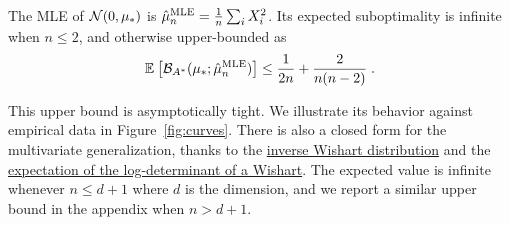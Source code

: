 \documentclass{article}
\newcommand*{\expect}[2][]{\ensuremath{\mathbb{E}_{#1} \left[ #2 \right] }} %
\newcommand{\logpart}{A}
\newcommand{\bregmanconj}{\cB_{\logpart^*}}
\begin{document}
\begin{example}
	\begin{theorem}
	The MLE of ${\mathcal N}(0,\mu_*)$ is $\hat \mu_n^\text{MLE} = \frac{1}{n} \sum_i X_i^2 $.
	Its expected suboptimality is infinite when $n\leq 2$, and otherwise upper-bounded as
	\begin{align}
		 \expect{\bregmanconj( \mu_*; \hat \mu_n^\text{MLE}) }
			\leq \inv{2n} +\frac{2}{n(n-2)} \; .
			\label{eq:MLE_rate}
	\end{align}
\end{theorem}
\end{example}
This upper bound is asymptotically tight.
We illustrate its behavior against empirical data in Figure~\ref{fig:curves}.
 There is also a closed form for the multivariate generalization, thanks to the \href{https://en.wikipedia.org/wiki/Inverse-Wishart_distribution}{inverse Wishart distribution} and the \href{https://en.wikipedia.org/wiki/Wishart_distribution#Log-expectation}{expectation of the log-determinant of a Wishart}. The expected value is infinite whenever $n \leq d+1$ where $d$ is the dimension, and we report a similar upper bound in the appendix when $n>d+1$.
 
\end{document}
